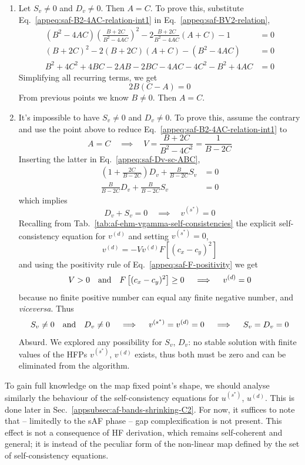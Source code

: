 \begin{enumerate}
	\begin{equation}\label{appeq:saf-B2-4AC-relation-int1}
		V = \frac{B+2C}{B^2 - 4AC}
	\end{equation}
	\item Let $S_v \neq 0$ and $D_v \neq 0$. Then $A=C$. To prove this, substitute Eq.~\eqref{appeq:saf-B2-4AC-relation-int1} in Eq.~\eqref{appeq:saf-BV2-relation},
	\[
	\begin{aligned}
		(B^2 - 4AC) \left(\frac{B+2C}{B^2 - 4AC}\right)^2 - 2\frac{B+2C}{B^2 - 4AC} (A+C) - 1 &= 0 \\
		(B+2C)^2 - 2(B+2C)(A+C) - (B^2 - 4AC) &= 0 \\
		B^2 + 4C^2 + 4BC - 2AB - 2BC - 4AC - 4C^2 - B^2 + 4AC &= 0
	\end{aligned}
	\]
	Simplifying all recurring terms, we get
	\[
	2B(C-A) = 0
	\]
	From previous points we know $B\neq 0$. Then $A=C$.
	\item It's impossible to have $S_v \neq 0$ and $D_v \neq 0$. To prove this, assume the contrary and use the point above to reduce  Eq.~\eqref{appeq:saf-B2-4AC-relation-int1} to
	\[
	A=C
	\quad\implies\quad
	V = \frac{B+2C}{B^2 - 4C^2} = \frac{1}{B-2C}
	\]
	Inserting the latter in Eq.~\eqref{appeq:saf-Dv-sc-ABC},
	\[
	\begin{aligned}
		\left( 1+\frac{2C}{B-2C} \right) D_v + \frac{B}{B-2C} S_v &= 0 \\
		\frac{B}{B-2C} D_v + \frac{B}{B-2C} S_v &= 0
	\end{aligned} 
	\]
	which implies
	\[
	D_v + S_v = 0
	\quad\implies\quad
	v^{(s^*)} = 0
	\]
	Recalling from Tab.~\ref{tab:af-ehm-vgamma-self-consistencies} the explicit self-consistency equation for $v^{(d)}$ and setting $v^{(s^*)} = 0$,
	\[
	v^{(d)} = - V v^{(d)} F\left[ (c_x-c_y)^2 \right]
	\]
	and using the positivity rule of Eq.~\eqref{appeq:saf-F-positivity} we get
	\[
	V > 0 \qq{and} F\left[ (c_x-c_y)^2 \right] \ge 0
	\quad\implies\quad
	v^{(d)} = 0
	\]
	because no finite positive number can equal any finite negative number, and \textit{viceversa}. Thus
	\[
	S_v \neq 0 \qq{and} D_v \neq 0
	\quad\implies\quad
	v^{(s^*)} = v^{(d)} = 0
	\quad\implies\quad
	S_v = D_v = 0
	\]
	Absurd. We explored any possibility for $S_v$, $D_v$: no stable solution with finite values of the HFPs $v^{(s^*)}$, $v^{(d)}$ exists, thus both must be zero and can be eliminated from the algorithm.
\end{enumerate}
To gain full knowledge on the map fixed point's shape, we should analyse similarly the behaviour of the self-consistency equations for $u^{(s^*)}$, $u^{(d)}$. This is done later in Sec.~\ref{appsubsec:af-bands-shrinking-C2}. For now, it suffices to note that -- limitedly to the sAF phase -- gap complexification is not present. This effect is not a consequence of HF derivation, which remains self-coherent and general; it is instead of the peculiar form of the non-linear map defined by the set of self-consistency equations.

